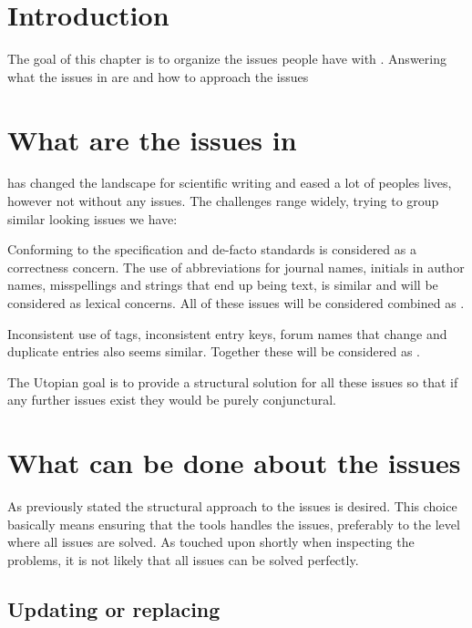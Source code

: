 \section{Introduction}
The goal of this chapter is to organize the issues people have with
{\bibtex}.  Answering what the issues in {\bibtex} are
 and how to approach the {\bibtex}
issues 

\section{What are the issues in {\bibtex}}
\label{sec:intro_what_issues}

{\bibtex} has changed the landscape for scientific writing and eased a
lot of peoples lives, however not without any issues.  The challenges
range widely, trying to group similar looking issues we have:


Conforming to the specification and de-facto standards is considered
as a correctness concern.  The use of abbreviations for journal names,
initials in author names, misspellings and {\bibtex} strings that end
up being text, is similar and will be considered as lexical concerns.
All of these issues will be considered combined as .

Inconsistent use of tags, inconsistent entry keys, forum names that
change and duplicate entries also seems similar.  Together these will
be considered as .

The Utopian goal is to provide a structural solution for all these
issues so that if any further issues exist they would be purely
conjunctural.


\section{What can be done about the {\bibtex} issues}
\label{sec:intro_what_to_do}

As previously stated the structural approach to the issues is desired.
This choice basically means ensuring that the tools handles the
issues, preferably to the level where all issues are solved.  As
touched upon shortly when inspecting the problems, it is not likely
that all issues can be solved perfectly.


\subsection{Updating or replacing {\bibtex}}


